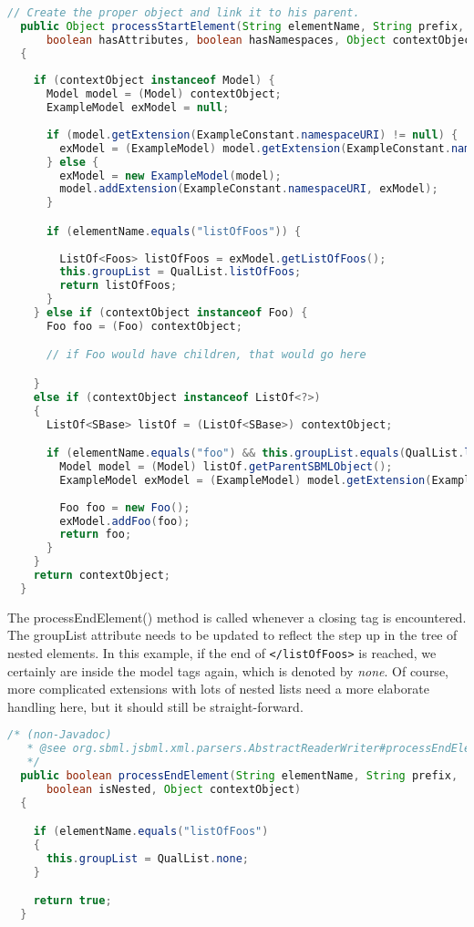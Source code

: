 \begin{lstlisting}[language=Java,caption={Extension parser: \texttt{processStartElement()}},label={lst:ModelExtParserStartElement}]
  // Create the proper object and link it to his parent.
  public Object processStartElement(String elementName, String prefix,
      boolean hasAttributes, boolean hasNamespaces, Object contextObject) 
  {
    
    if (contextObject instanceof Model) {
      Model model = (Model) contextObject;
      ExampleModel exModel = null;
      
      if (model.getExtension(ExampleConstant.namespaceURI) != null) {
        exModel = (ExampleModel) model.getExtension(ExampleConstant.namespaceURI);
      } else {
        exModel = new ExampleModel(model);
        model.addExtension(ExampleConstant.namespaceURI, exModel);
      }

      if (elementName.equals("listOfFoos")) {
          
        ListOf<Foos> listOfFoos = exModel.getListOfFoos();
        this.groupList = QualList.listOfFoos;
        return listOfFoos;
      } 
    } else if (contextObject instanceof Foo) {
      Foo foo = (Foo) contextObject;

      // if Foo would have children, that would go here

    }
    else if (contextObject instanceof ListOf<?>) 
    {
      ListOf<SBase> listOf = (ListOf<SBase>) contextObject;

      if (elementName.equals("foo") && this.groupList.equals(QualList.listOfFoos)) { 
        Model model = (Model) listOf.getParentSBMLObject();
        ExampleModel exModel = (ExampleModel) model.getExtension(ExampleConstant.namespaceURI); 
        
        Foo foo = new Foo();       
        exModel.addFoo(foo);
        return foo;
      } 
    }
    return contextObject;
  }
\end{lstlisting}

The processEndElement() method is called whenever a closing tag is encountered.
The groupList attribute needs to be updated to reflect the step up in the tree of nested elements.
In this example, if the end of \texttt{</listOfFoos>} is reached, we certainly are inside the model tags again, which is denoted by \emph{none}.
Of course, more complicated extensions with lots of nested lists need a more elaborate handling here, but it should still be straight-forward.

\begin{lstlisting}[language=Java,caption={Extension parser: \texttt{processEndElement()}},label={lst:ModelExtParserEndElement}]
  /* (non-Javadoc)
   * @see org.sbml.jsbml.xml.parsers.AbstractReaderWriter#processEndElement(java.lang.String, java.lang.String, boolean, java.lang.Object)
   */
  public boolean processEndElement(String elementName, String prefix,
      boolean isNested, Object contextObject) 
  {

    if (elementName.equals("listOfFoos")
    {
      this.groupList = QualList.none;
    }

    return true;
  }
\end{lstlisting}

